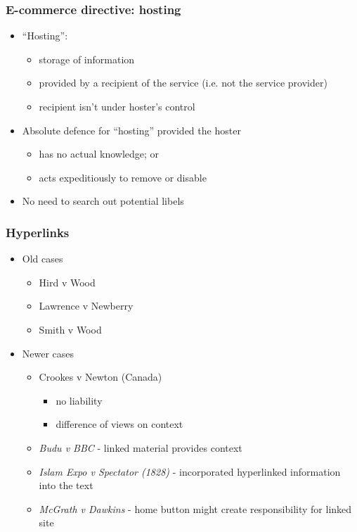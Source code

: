 \documentclass[ignorenonframetext,]{beamer}
\begin{document}
\begin{frame}
  \frametitle{E-commerce directive: hosting}
  \begin{itemize}
  \item ``Hosting'':
    \begin{itemize}
    \item storage of information
    \item provided by a recipient of the service (i.e. not the service provider)
    \item recipient isn't under hoster's control
   \end{itemize}
  \item Absolute defence for ``hosting'' provided the hoster
    \begin{itemize}
    \item has no actual knowledge; or
    \item acts expeditiously to remove or disable
    \end{itemize}
  \item  {No need to search out potential libels}
  \end{itemize}
  
\end{frame}

\begin{frame}
\frametitle{Hyperlinks}
\begin{itemize}
\item Old cases
  \begin{itemize}
  \item Hird v Wood
  \item Lawrence v Newberry
  \item Smith v Wood
  \end{itemize}
\item Newer cases
  \begin{itemize}
  \item Crookes v Newton (Canada)
    \begin{itemize}
    \item no liability
    \item difference of views on context
    \end{itemize}
  \item {\it Budu v BBC} - linked material provides context
  \item {\it Islam Expo v Spectator (1828)} - incorporated hyperlinked information into the text
  \item {\it McGrath v Dawkins} - home button might create responsibility for linked site
  \end{itemize}
\end{itemize}
\end{frame}
\end{document}
